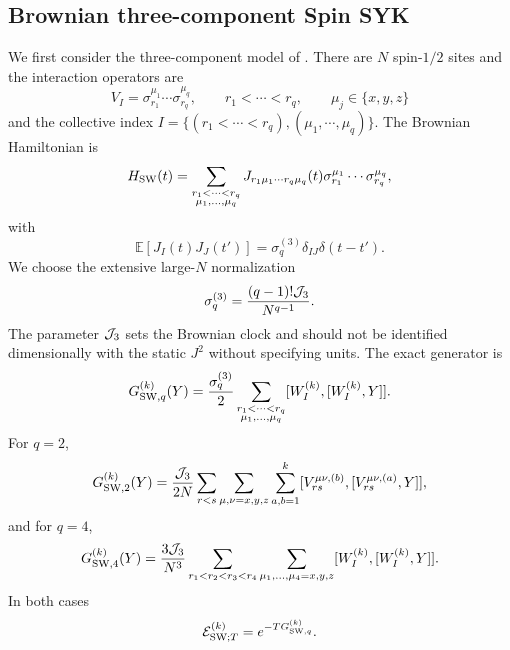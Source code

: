 \documentclass{article}
\theoremstyle{definition}
\begin{document}
\subsection{Brownian three-component Spin SYK}

We first consider the three-component model of \cite{swingle2024bosonic}.  There
are $N$ spin-$1/2$ sites and the interaction operators are
\begin{equation}
    V_I=\sigma_{r_1}^{\mu_1}\cdots\sigma_{r_q}^{\mu_q},
    \qquad
    r_1<\cdots<r_q,
    \qquad
    \mu_j\in\{x,y,z\}
\end{equation}
and the collective index $I=\{(r_1<\cdots <r_q), (\mu_1,\cdots, \mu_q)\}$.
The Brownian Hamiltonian is
\begin{equation}
    H_{\rm SW}(t)
    =\sum_{\substack{r_1<\cdots<r_q\\
                    \mu_1,\ldots,\mu_q}}
    J_{r_1\mu_1\cdots r_q\mu_q}(t)
    \sigma_{r_1}^{\mu_1}\cdots\sigma_{r_q}^{\mu_q},
\end{equation}
with
\begin{equation}
    \mathbb E[J_I(t)J_J(t')]
    =\sigma_q^{(3)}\delta_{IJ}\delta(t-t').
\end{equation}
We choose the extensive large-$N$ normalization
\begin{equation}
    \sigma_q^{(3)}
    =\frac{(q-1)!{\cal J}_3}{N^{q-1}}.
\end{equation}
The parameter ${\cal J}_3$ sets the Brownian clock and should not be
identified dimensionally with the static $J^2$ without specifying units.
The exact generator is
\begin{equation}
    G_{{\rm SW},q}^{(k)}(Y)
    =\frac{\sigma_q^{(3)}}{2}
    \sum_{\substack{r_1<\cdots<r_q\\
                    \mu_1,\ldots,\mu_q}}
    [W_I^{(k)},[W_I^{(k)},Y]].
\end{equation}
For $q=2$,
\begin{equation}
    G_{{\rm SW},2}^{(k)}(Y)
    =\frac{{\cal J}_3}{2N}
    \sum_{r<s}\sum_{\mu,\nu=x,y,z}\sum_{a,b=1}^k
    [V_{rs}^{\mu\nu,(b)},[V_{rs}^{\mu\nu,(a)},Y]],
\end{equation}
and for $q=4$,
\begin{equation}
    G_{{\rm SW},4}^{(k)}(Y)
    =\frac{3{\cal J}_3}{N^3}
    \sum_{r_1<r_2<r_3<r_4}
    \sum_{\mu_1,\ldots,\mu_4=x,y,z}
    [W_I^{(k)},[W_I^{(k)},Y]].
\end{equation}
In both cases
\begin{equation}
    {\cal E}_{{\rm SW};T}^{(k)}
    =e^{-TG_{{\rm SW},q}^{(k)}}.
\end{equation}
\end{document}
